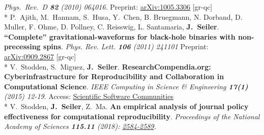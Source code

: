 \documentclass[]{seiler-resume}
\begin{document}
{ \textit{Phys.\ Rev.\  D {\bf 82} (2010) 064016}.  Preprint: \href{http://arxiv.org/abs/1005.3306}{arXiv:1005.3306} [gr-qc]\vspace{0.2cm} \\*
{P.~Ajith, M.~Hannam, S.~Husa, Y.~Chen, B. Bruegmann, N. Dorband, D. Muller, F. Ohme, D. Pollney, C. Reisswig, L. Santamaria, {\bf J.~Seiler}.} \textbf{``Complete'' gravitational-waveforms for black-hole binaries with non-precessing spins}.  \textit{Phys. Rev. Lett. {\bf 106} (2011) 241101} Preprint: \href{http://arxiv.org/abs/0909.2867}{arXiv:0909.2867} [gr-qc]\vspace{0.2cm} \\*
{V.~Stodden, S.~Miguez, {\bf J.~Seiler}.} \textbf{ResearchCompendia.org: Cyberinfrastructure for Reproducibility and Collaboration in Computational Science}. \textit{IEEE Computing in Science \& Engineering {\bf 17(1)} (2015) 12-19}. Access: \href{http://online.qmags.com/CISE0115?pg=14&mode=2#pg14&mode2?fs=2&pg=14&mode=2}{Scientific Software Communities}\vspace{0.2cm} \\*
{V.~Stodden, {\bf J.~Seiler}, Z.~Ma. }\textbf{An empirical analysis of journal policy effectiveness for computational reproducibility}. \textit{Proceedings of the National Academy of Sciences {\bf 115.11} (2018): \href{https://www.pnas.org/content/115/11/2584}{2584-2589}.}}%
\end{document}
